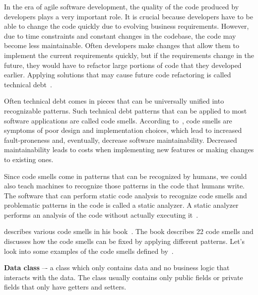 

In the era of agile software development, the quality of the code produced by developers plays a very important role.
It is crucial because developers have to be able to change the code quickly due to evolving business requirements.
However, due to time constraints and constant changes in the codebase, the code may become less maintainable.
Often developers make changes that allow them to implement the current requirements quickly, but if the requirements
change in the future, they would have to refactor large portions of code that they developed earlier.
Applying solutions that may cause future code refactoring is called technical debt~\cite{technical-debt}.



Often technical debt comes in pieces that can be universally unified into recognizable patterns.
Such technical debt patterns that can be applied to most software applications are called code smells.
According to~\cite{code-smell-definition}, code smells are symptoms of poor design and implementation choices, which
lead to increased fault-proneness and, eventually, decrease software maintainability.
Decreased maintainability leads to costs when implementing new features or making changes to existing ones.

Since code smells come in patterns that can be recognized by humans, we could also teach machines to recognize those
patterns in the code that humans write.
The software that can perform static code analysis to recognize code smells and problematic patterns in the code
is called a static analyzer.
A static analyzer performs an analysis of the code without actually executing it~\cite{static-analyzers-paper}.


\citeauthor{refactoring-fowler} describes various code smells in his book~\cite{refactoring-fowler}.
The book describes 22 code smells and discusses how the code smells can be fixed by applying different
patterns.
Let's look into some examples of the code smells defined by~\citeauthor{refactoring-fowler}.

\begin{flushleft}
    \textbf{Data class} –- a class which only contains data and no business logic that interacts
    with the data.
    The class usually contains only public fields or private fields that only have getters and setters.
\end{flushleft}

